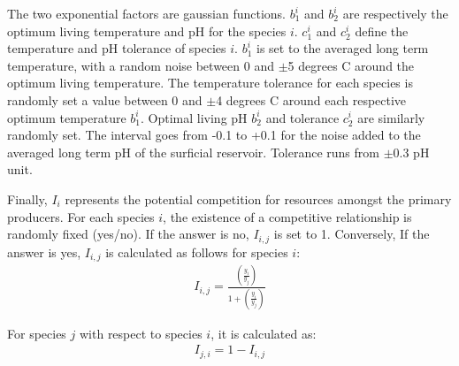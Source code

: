 \documentclass[11pt, oneside]{article}   	%
\begin{document}
The two exponential factors are gaussian functions. $b_{1}^{i}$ and $b_{2}^{i}$ are respectively the optimum living temperature and pH for the species $i$. $c_{1}^{i}$ and $c_{2}^{i}$ define the temperature and pH tolerance of species $i$. $b_{1}^{i}$ is set to the averaged long term temperature, with a random noise between 0 and $\pm$5 degrees C around the optimum living temperature. The temperature tolerance for each species is randomly set a value between 0 and $\pm$4 degrees C around each respective optimum temperature $b_{1}^{i}$. Optimal living pH $b_{2}^{i}$ and tolerance $c_{2}^{i}$ are similarly randomly set. The interval goes from -0.1 to +0.1 for the noise added to the averaged long term pH of the surficial reservoir. Tolerance runs from $\pm$0.3 pH unit. 

Finally, $I_{i}$ represents the potential competition for resources amongst the primary producers. For each species $i$, the existence of a competitive relationship is randomly fixed (yes/no). If the answer is no, $I_{i,j}$ is set to 1. Conversely, If the answer is yes, $I_{i,j}$ is calculated as follows for species $i$:
\\
\begin{eqnarray}
I_{i,j}=\frac{\left(\frac{y_i}{y_j}\right)}  {1+\left(\frac{y_i}{y_j}\right)}
\label{competition}
\end{eqnarray}

For species $j$ with respect to species $i$, it is calculated as:
\\
\begin{eqnarray}
I_{j,i}=1-I_{i,j}
\label{competition2}
\end{eqnarray}
\end{document}
